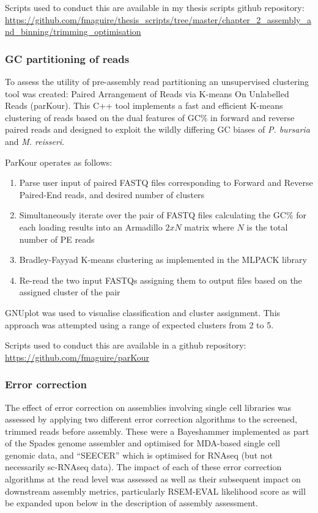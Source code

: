 Scripts used to conduct this are available in my thesis scripts github repository:
\url{https://github.com/fmaguire/thesis_scripts/tree/master/chapter_2_assembly_and_binning/trimming_optimisation}

\subsubsection{GC partitioning of reads}

To assess the utility of pre-assembly read partitioning an unsupervised clustering tool was created:
Paired Arrangement of Reads via K-means On Unlabelled Reads (parKour).
This C++ tool implements a fast and efficient K-means clustering of reads based on the dual features
of GC\% in forward and reverse paired reads and designed to exploit the wildly differing GC
biases of \textit{P. bursaria} and \textit{M. reisseri}.

ParKour operates as follows:
\begin{enumerate}
    \item Parse user input of paired FASTQ files corresponding to Forward and Reverse Paired-End reads, and desired number of clusters
    \item Simultaneously iterate over the pair of FASTQ files calculating the GC\% for each loading results into an Armadillo \(2xN\) matrix \citep{Sanderson2010} where \(N\) is the total number of PE reads
    \item Bradley-Fayyad K-means \citep{Bradley1998} clustering as implemented in the MLPACK library \citep{mlpack2013}
    \item Re-read the two input FASTQs assigning them to output files based on the assigned cluster of the pair
\end{enumerate}

GNUplot \citep{Gnuplot44} was used to visualise classification and cluster assignment.
This approach was attempted using a range of expected clusters from 2 to 5.

Scripts used to conduct this are available in a github repository:
\url{https://github.com/fmaguire/parKour}

\subsubsection{Error correction}

The effect of error correction on assemblies involving single cell libraries was assessed 
by applying two different error correction algorithms to the screened, trimmed reads before assembly.
These were a Bayeshammer \citep{Nikolenko2013} implemented as part of the Spades 
genome assembler \citep{Bankevich2012} and optimised for MDA-based single cell genomic data, 
and ``SEECER'' \citep{Le2013} which is optimised for RNAseq (but not necessarily sc-RNAseq
data). 
The impact of each of these error correction algorithms at the read level was assessed as well 
as their subsequent impact on downstream assembly metrics, particularly RSEM-EVAL likelihood score
as will be expanded upon below in the description of assembly assessment.

